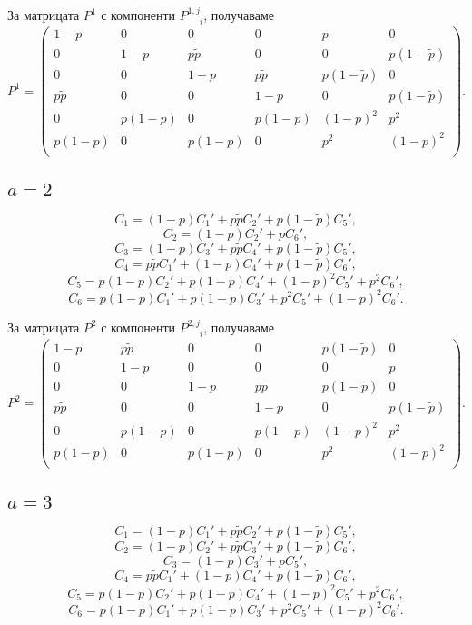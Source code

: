\documentclass[english,bulgarian,a4paper,10pt]{article}
\begin{document}
За матрицата $P^{1}$ с компоненти $P^{1,j}_{\phantom{1,j}i}$, получаваме
\begin{equation}
 P^{1} = \begin{pmatrix}
          1-p &0 &0 &0 &p &0\\
          0 &1-p &p\tilde{p} &0 &0 &p(1-\tilde{p})\\
          0 &0 &1-p &p\tilde{p} &p(1-\tilde{p}) &0\\
          p\tilde{p} &0 &0 &1-p &0 &p(1-\tilde{p})\\
          0 &p(1-p) &0 &p(1-p) &(1-p)^2 &p^2\\
          p(1-p) &0 &p(1-p) &0 &p^2 &(1-p)^2\\
         \end{pmatrix}.
\end{equation}

\subsection{$a=2$}
$$C_1 = (1-p) C_1' + p\tilde{p} C_2' + p(1-\tilde{p}) C_5',$$
$$C_2 = (1-p) C_2' + p C_6',$$
$$C_3 = (1-p) C_3' + p\tilde{p} C_4' + p(1-\tilde{p}) C_5',$$
$$C_4 = p\tilde{p} C_1' + (1-p) C_4' + p(1-\tilde{p}) C_6',$$
$$C_5 = p(1-p) C_2' + p(1-p) C_4' + (1-p)^2 C_5' + p^2 C_6',$$
$$C_6 = p(1-p) C_1' + p(1-p) C_3' + p^2 C_5' + (1-p)^2 C_6'.$$

За матрицата $P^{2}$ с компоненти $P^{2,j}_{\phantom{2,j}i}$, получаваме
\begin{equation}
 P^{2} = \begin{pmatrix}
          1-p &p\tilde{p} &0 &0 &p(1-\tilde{p}) &0\\
          0 &1-p &0 &0 &0 &p\\
          0 &0 &1-p &p\tilde{p} &p(1-\tilde{p}) &0\\
          p\tilde{p} &0 &0 &1-p &0 &p(1-\tilde{p})\\
          0 &p(1-p) &0 &p(1-p) &(1-p)^2 &p^2\\
          p(1-p) &0 &p(1-p) &0 &p^2 &(1-p)^2\\
         \end{pmatrix}.
\end{equation}

\subsection{$a=3$}
$$C_1 = (1-p) C_1' + p\tilde{p} C_2' + p(1-\tilde{p}) C_5',$$
$$C_2 = (1-p) C_2' + p\tilde{p} C_3' + p(1-\tilde{p}) C_6',$$
$$C_3 = (1-p) C_3' + p C_5',$$
$$C_4 = p\tilde{p} C_1' + (1-p) C_4' + p(1-\tilde{p}) C_6',$$
$$C_5 = p(1-p) C_2' + p(1-p) C_4' + (1-p)^2 C_5' + p^2 C_6',$$
$$C_6 = p(1-p) C_1' + p(1-p) C_3' + p^2 C_5' + (1-p)^2 C_6'.$$
\end{document}
